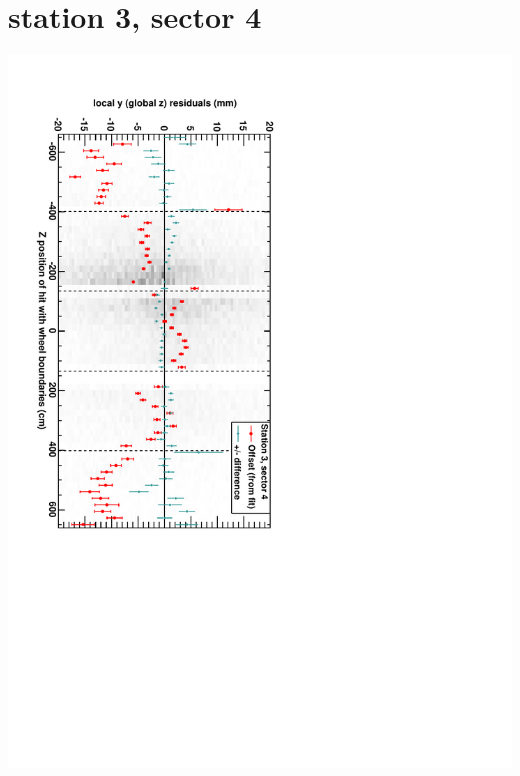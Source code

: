 \documentclass[compress]{beamer}
\begin{document}
\section*{station 3, sector 4}
\begin{frame} \vfill \mbox{\hspace{-1 cm}\includegraphics[height=1.2\linewidth, angle=90]{DTzVsZ_st3_sr04.pdf}} \end{frame}
\end{document}
